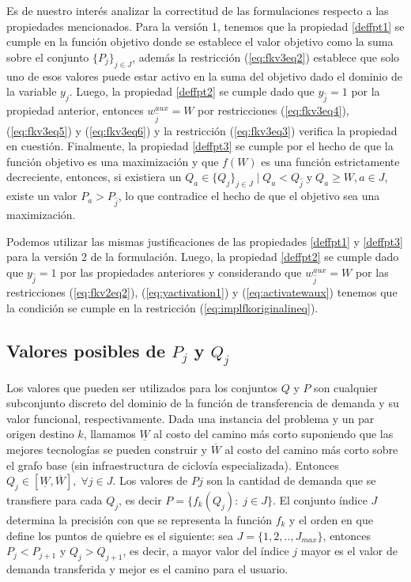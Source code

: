 Es de nuestro interés analizar la correctitud de las formulaciones respecto a las propiedades mencionados. Para la versión 1, tenemos que la propiedad \ref{deffpt1} se cumple en la función objetivo donde se establece el valor objetivo como la suma sobre el conjunto $\{P_j\}_{j \in J}$, además la restricción (\ref{eq:fkv3eq2}) establece que solo uno de esos valores puede estar activo en la suma del objetivo dado el dominio de la variable $y_j$. Luego, la propiedad \ref{deffpt2} se cumple dado que $y_{\hat{j}} = 1$ por la propiedad anterior, entonces $w_{\hat{j}}^{aux} = W$ por restricciones (\ref{eq:fkv3eq4}), (\ref{eq:fkv3eq5}) y (\ref{eq:fkv3eq6}) y la restricción (\ref{eq:fkv3eq3}) verifica la propiedad en cuestión. Finalmente, la propiedad \ref{deffpt3} se cumple por el hecho de que la función objetivo es una maximización y que $f(W)$ es una función estrictamente decreciente, entonces, si existiera un $Q_a \in \{Q_j\}_{j \in J} \;|\; Q_a < Q_{\hat{j}} \;\text{y}\; Q_a \geq W, a \in J$, existe un valor $P_a > P_{\hat{j}}$, lo que contradice el hecho de que el objetivo sea una maximización.

Podemos utilizar las mismas justificaciones de las propiedades \ref{deffpt1} y \ref{deffpt3} para la versión 2 de la formulación. Luego, la propiedad \ref{deffpt2} se cumple dado que $y_{\hat{j}} = 1$ por las propiedades anteriores y considerando que $w^{aux}_{\hat{j}} = W$ por las restricciones (\ref{eq:fkv2eq2}), (\ref{eq:yactivation1}) y (\ref{eq:activatewaux}) tenemos que la condición se cumple en la restricción (\ref{eq:implfkoriginalineq}).

\subsection{Valores posibles de $P_j$ y $Q_j$}

Los valores que pueden ser utilizados para los conjuntos $Q$ y $P$ son cualquier subconjunto discreto del dominio de la función de transferencia de demanda y su valor funcional, respectivamente. Dada una instancia del problema y un par origen destino $k$, llamamos $\underline{W}$ al costo del camino más corto suponiendo que las mejores tecnologías se pueden construir y $\overline{W}$ al costo del camino más corto sobre el grafo base (sin infraestructura de ciclovía especializada). Entonces $Q_j \in [\underline{W}, \overline{W}],\; \forall j \in J$. Los valores de $Pj$ son la cantidad de demanda que se transfiere para cada $Q_j$, es decir $P = \{f_k(Q_j):\; j \in J\}$. El conjunto índice $J$ determina la precisión con que se representa la función $f_k$ y el orden en que define los puntos de quiebre es el siguiente: sea $J = \{1, 2, .. , J_{max}\}$, entonces $P_j < P_{j+1}$ y $Q_j > Q_{j+1}$, es decir, a mayor valor del índice $j$ mayor es el valor de demanda transferida y mejor es el camino para el usuario.

